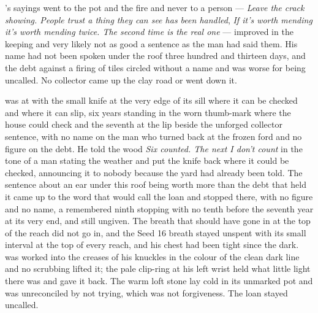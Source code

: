 's sayings went to the pot and the fire and never to a person --- \emph{Leave the crack showing. People trust a thing they can see has been handled}, \emph{If it's worth mending it's worth mending twice. The second time is the real one} --- improved in the keeping and very likely not as good a sentence as the man had said them. His name had not been spoken under the roof three hundred and thirteen days, and the debt against a firing of tiles circled without a name and was worse for being uncalled. No collector came up the clay road or went down it.

 was at  with the small knife at the very edge of its sill where it can be checked and where it can slip, six years standing in the worn thumb-mark where the house could check and the seventh at the lip beside the unforged collector sentence, with no name on the man who turned back at the frozen ford and no figure on the debt. He told the wood \emph{Six counted. The next I don't count} in the tone of a man stating the weather and put the knife back where it could be checked, announcing it to nobody because the yard had already been told. The sentence about an ear under this roof being worth more than the debt that held it came up to the word that would call the loan and stopped there, with no figure and no name, a remembered ninth stopping with no tenth before the seventh year at its very end, and still ungiven. The breath that should have gone in at the top of the reach did not go in, and the Seed 16 breath stayed unspent with its small interval at the top of every reach, and his chest had been tight since the dark.  was worked into the creases of his knuckles in the colour of the clean dark line and no scrubbing lifted it; the pale clip-ring at his left wrist held what little light there was and gave it back. The warm loft stone lay cold in its unmarked pot and was unreconciled by not trying, which was not forgiveness. The loan stayed uncalled.

